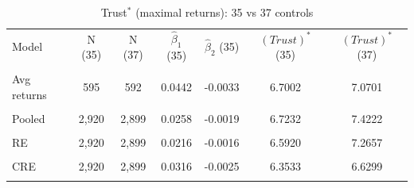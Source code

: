 \begin{table}[htbp]\centering\small
\caption{Trust\(^*\) (maximal returns): 35 vs 37 controls}
\label{tab:38_trust_star}
\begin{tabular}{lcccccc}\toprule
Model & N (35) & N (37) & \(\hat\beta_1\) (35) & \(\hat\beta_2\) (35) & \((\textit{Trust})^*\) (35) & \((\textit{Trust})^*\) (37) \\\\ \midrule
Avg returns & 595 & 592 & 0.0442 & -0.0033 & 6.7002 & 7.0701 \\\\
Pooled & 2,920 & 2,899 & 0.0258 & -0.0019 & 6.7232 & 7.4222 \\\\
RE & 2,920 & 2,899 & 0.0216 & -0.0016 & 6.5920 & 7.2657 \\\\
CRE & 2,920 & 2,899 & 0.0316 & -0.0025 & 6.3533 & 6.6299 \\\\
\bottomrule
\end{tabular}
\end{table}
